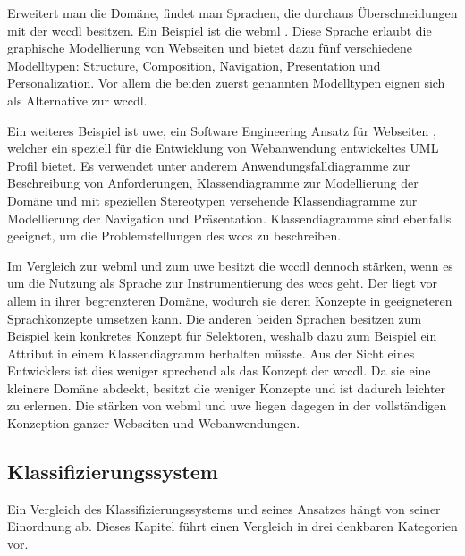         Erweitert man die Domäne, findet man Sprachen,
        die durchaus Überschneidungen mit der \gls{wccdl} besitzen.
        Ein Beispiel ist die \gls{webml} \cite{ceri:webML}.
        Diese Sprache erlaubt die graphische Modellierung von Webseiten
        und bietet dazu fünf verschiedene Modelltypen:
        Structure, Composition, Navigation, Presentation und Personalization.
        Vor allem die beiden zuerst genannten Modelltypen eignen sich
        als Alternative zur \gls{wccdl}.

        Ein weiteres Beispiel ist \gls{uwe},
        ein Software Engineering Ansatz für Webseiten \cite{koch:uwe},
        welcher ein speziell für die Entwicklung von Webanwendung entwickeltes
        UML Profil bietet.
        Es verwendet unter anderem Anwendungsfalldiagramme zur Beschreibung von Anforderungen,
        Klassendiagramme zur Modellierung der Domäne
        und mit speziellen Stereotypen versehende Klassendiagramme zur Modellierung der Navigation
        und Präsentation.
        Klassendiagramme sind ebenfalls geeignet, um die Problemstellungen des \gls{wccs} zu beschreiben.

        Im Vergleich zur \gls{webml} und zum \gls{uwe} besitzt die \gls{wccdl} dennoch stärken,
        wenn es um die Nutzung als Sprache zur Instrumentierung des \gls{wccs} geht.
        Der liegt vor allem in ihrer begrenzteren Domäne,
        wodurch sie deren Konzepte in geeigneteren Sprachkonzepte umsetzen kann.
        Die anderen beiden Sprachen besitzen zum Beispiel kein konkretes Konzept für
        Selektoren, weshalb dazu zum Beispiel ein Attribut in einem Klassendiagramm herhalten müsste.
        Aus der Sicht eines Entwicklers ist dies weniger sprechend als das Konzept der \gls{wccdl}.
        Da sie eine kleinere Domäne abdeckt, besitzt die weniger Konzepte
        und ist dadurch leichter zu erlernen.
        Die stärken von \gls{webml} und \gls{uwe} liegen dagegen in der vollständigen Konzeption
        ganzer Webseiten und Webanwendungen.
    
    \subsection{Klassifizierungssystem}
        \label{section:discussionComparisonClassificationSystem}
        Ein Vergleich des Klassifizierungssystems und seines Ansatzes
        hängt von seiner Einordnung ab.
        Dieses Kapitel führt einen Vergleich in drei denkbaren Kategorien vor.

